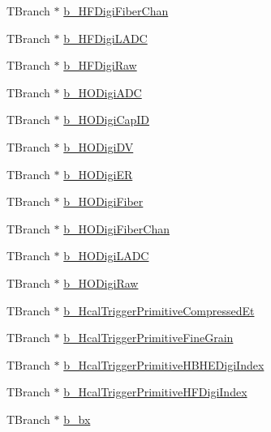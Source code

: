 \begin{DoxyCompactItemize}
\item 
T\+Branch $\ast$ \hyperlink{class_hcal_tuple_tree_ae35065b2245e679b7e62870864abd00d}{b\+\_\+\+H\+F\+Digi\+Fiber\+Chan}
\item 
T\+Branch $\ast$ \hyperlink{class_hcal_tuple_tree_aef889b9eca9be9db2cce250b9b2ab113}{b\+\_\+\+H\+F\+Digi\+L\+A\+D\+C}
\item 
T\+Branch $\ast$ \hyperlink{class_hcal_tuple_tree_a985099b927f65ac7f5739d6f0d04775e}{b\+\_\+\+H\+F\+Digi\+Raw}
\item 
T\+Branch $\ast$ \hyperlink{class_hcal_tuple_tree_a202e751ee660f8199c2af94e4776e289}{b\+\_\+\+H\+O\+Digi\+A\+D\+C}
\item 
T\+Branch $\ast$ \hyperlink{class_hcal_tuple_tree_abcff06b7d4d00ef7a68338d5566c65d4}{b\+\_\+\+H\+O\+Digi\+Cap\+I\+D}
\item 
T\+Branch $\ast$ \hyperlink{class_hcal_tuple_tree_aab27faf53eac4fa90f51936f3c211a24}{b\+\_\+\+H\+O\+Digi\+D\+V}
\item 
T\+Branch $\ast$ \hyperlink{class_hcal_tuple_tree_a8b27ab9d3c09df306d78038c6ec1d095}{b\+\_\+\+H\+O\+Digi\+E\+R}
\item 
T\+Branch $\ast$ \hyperlink{class_hcal_tuple_tree_af775c7fbf9c4d20a71833176c7ecd379}{b\+\_\+\+H\+O\+Digi\+Fiber}
\item 
T\+Branch $\ast$ \hyperlink{class_hcal_tuple_tree_a20d9d674656fab8624587f56b796f82d}{b\+\_\+\+H\+O\+Digi\+Fiber\+Chan}
\item 
T\+Branch $\ast$ \hyperlink{class_hcal_tuple_tree_a3439baf7f88c8c4ef013bb425905a74a}{b\+\_\+\+H\+O\+Digi\+L\+A\+D\+C}
\item 
T\+Branch $\ast$ \hyperlink{class_hcal_tuple_tree_a149e3b2a253d87fccb7884945a4b55b0}{b\+\_\+\+H\+O\+Digi\+Raw}
\item 
T\+Branch $\ast$ \hyperlink{class_hcal_tuple_tree_a11d179155ff9deacbd3f70f752a3383a}{b\+\_\+\+Hcal\+Trigger\+Primitive\+Compressed\+Et}
\item 
T\+Branch $\ast$ \hyperlink{class_hcal_tuple_tree_aa5b776930738d5bb3b01bdd6ff8083d1}{b\+\_\+\+Hcal\+Trigger\+Primitive\+Fine\+Grain}
\item 
T\+Branch $\ast$ \hyperlink{class_hcal_tuple_tree_ab86b80f73d1b563d0c26cc1a627f1390}{b\+\_\+\+Hcal\+Trigger\+Primitive\+H\+B\+H\+E\+Digi\+Index}
\item 
T\+Branch $\ast$ \hyperlink{class_hcal_tuple_tree_a8878c07329b1274f6ff2aa3ee7748a16}{b\+\_\+\+Hcal\+Trigger\+Primitive\+H\+F\+Digi\+Index}
\item 
T\+Branch $\ast$ \hyperlink{class_hcal_tuple_tree_a0dc79b450e2928bf833003b53dbc84d8}{b\+\_\+bx}

\end{DoxyCompactItemize}
